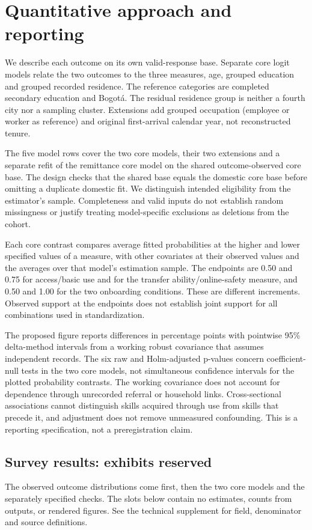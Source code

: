 \documentclass[12pt]{article}
\begin{document}
\section{Quantitative approach and reporting}
We describe each outcome on its own valid-response base. Separate core logit models relate the two outcomes to the three measures, age, grouped education and grouped recorded residence. The reference categories are completed secondary education and Bogotá. The residual residence group is neither a fourth city nor a sampling cluster. Extensions add grouped occupation (employee or worker as reference) and original first-arrival calendar year, not reconstructed tenure.

The five model rows cover the two core models, their two extensions and a separate refit of the remittance core model on the shared outcome-observed core base. The design checks that the shared base equals the domestic core base before omitting a duplicate domestic fit. We distinguish intended eligibility from the estimator's sample. Completeness and valid inputs do not establish random missingness or justify treating model-specific exclusions as deletions from the cohort.

Each core contrast compares average fitted probabilities at the higher and lower specified values of a measure, with other covariates at their observed values and the averages over that model's estimation sample. The endpoints are 0.50 and 0.75 for access/basic use and for the transfer ability/online-safety measure, and 0.50 and 1.00 for the two onboarding conditions. These are different increments. Observed support at the endpoints does not establish joint support for all combinations used in standardization.

The proposed figure reports differences in percentage points with pointwise 95\% delta-method intervals from a working robust covariance that assumes independent records. The six raw and Holm-adjusted p-values concern coefficient-null tests in the two core models, not simultaneous confidence intervals for the plotted probability contrasts. The working covariance does not account for dependence through unrecorded referral or household links. Cross-sectional associations cannot distinguish skills acquired through use from skills that precede it, and adjustment does not remove unmeasured confounding. This is a reporting specification, not a preregistration claim.

\subsection{Survey results: exhibits reserved}
The observed outcome distributions come first, then the two core models and the separately specified checks. The slots below contain no estimates, counts from outputs, or rendered figures. See the technical supplement for field, denominator and source definitions.
\end{document}
